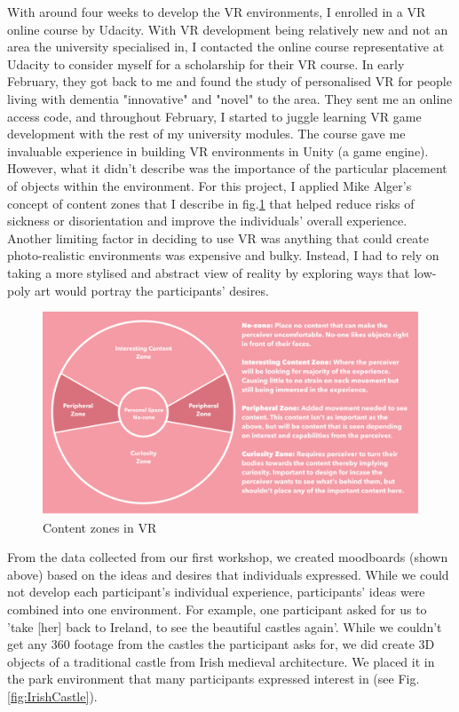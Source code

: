 With around four weeks to develop the VR environments, I enrolled in a VR online course by Udacity. With VR development being relatively new and not an area the university specialised in, I contacted the online course representative at Udacity to consider myself for a scholarship for their VR course. In early February, they got back to me and found the study of personalised VR for people living with dementia "innovative" and "novel" to the area. They sent me an online access code, and throughout February, I started to juggle learning VR game development with the rest of my university modules. The course gave me invaluable experience in building VR environments in Unity (a game engine). However, what it didn't describe was the importance of the particular placement of objects within the environment. For this project, I applied Mike Alger's \citep{alger_visual_2015} concept of content zones that I describe in fig.\ref{fig:ContentZone} that helped reduce risks of sickness or disorientation and improve the individuals' overall experience. Another limiting factor in deciding to use VR was anything that could create photo-realistic environments was expensive and bulky. Instead, I had to rely on taking a more stylised and abstract view of reality by exploring ways that low-poly art would portray the participants' desires.

\begin{figure}
\centering
\includegraphics[width=.8\linewidth]{Images/ContentZones.png}
\caption{Content zones in VR}
\label{fig:ContentZone}
\end{figure}

From the data collected from our first workshop, we created moodboards (shown above) based on the ideas and desires that individuals expressed. While we could not develop each participant's individual experience, participants' ideas were combined into one environment. For example, one participant asked for us to 'take [her] back to Ireland, to see the beautiful castles again'. While we couldn’t get any 360 footage from the castles the participant asks for, we did create 3D objects of a traditional castle from Irish medieval architecture. We placed it in the park environment that many participants expressed interest in (see Fig.\ref{fig:IrishCastle}).


